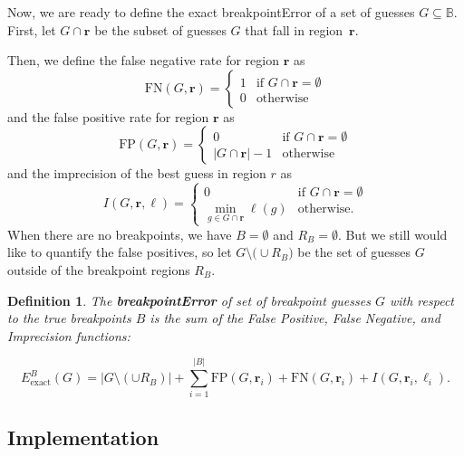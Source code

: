 \documentclass{jsfds} %
\newtheorem{definition}{Definition}
\renewcommand{\r}{ \mathbf{ r} }
\begin{document}
Now, we are ready to define the exact breakpointError of a set of
guesses $G\subseteq\mathbb B$.
First, let $G \cap\r$ be the subset of guesses $G$ that fall in
region~$\r$. 

Then, we define the false negative rate for region $\r$ as 
\begin{equation}
  \label{eq:FN_i}
  \text{FN}(G,\r) = 
  \begin{cases}
    1 & \text{if } G\cap\r = \emptyset\\
    0 & \text{otherwise}
  \end{cases}
\end{equation}
and the false positive rate for region $\r$ as
\begin{equation}
  \label{eq:FP_i}
  \text{FP}(G,\r) =
  \begin{cases}
    0 & \text{if }G\cap\r = \emptyset\\
    |G\cap\r|-1 &\text{otherwise}
  \end{cases}
\end{equation}
and the imprecision of the best guess in region $r$ as
\begin{equation}
  \label{eq:imprecision}
  I(G,\r,\ell) =
  \begin{cases}
    0 & \text{if } G\cap\r = \emptyset\\
    \min_{g\in G\cap\r} \ell(g) & \text{otherwise}.
  \end{cases}
\end{equation}
When there are no breakpoints, we have $B=\emptyset$ and
$R_B=\emptyset$. But we still would like to quantify the false
positives, so let $G\setminus\big( \cup R_B\big) $ be the set of
guesses $G$ outside of the breakpoint regions $R_B$. 

\begin{definition}
  \label{def:exact_breakpoint_cost}
  The \textbf{breakpointError} of set of breakpoint guesses $G$ with
  respect to the true breakpoints $B$ is the sum of the False
  Positive, False Negative, and Imprecision functions:

\begin{equation*}
  {E }_{\text{exact}}^B(G) =
  \big|G\setminus(\cup R_B)\big|
 + \sum_{i=1}^{|B|}\textrm{FP}(G,\r_i)+\textrm{FN}(G,\r_i)+I(G,\r_i,\ell_i).
\end{equation*}
\end{definition}

\subsection{Implementation}
\end{document}
